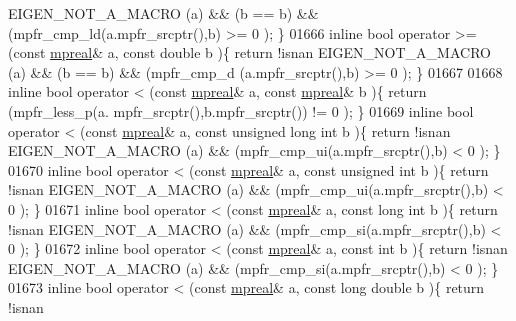 \begin{DoxyCode}
      EIGEN\_NOT\_A\_MACRO (a) && (b == b) && (mpfr\_cmp\_ld(a.mpfr\_srcptr(),b) >= 0 );   \}
01666 \textcolor{keyword}{inline} \textcolor{keywordtype}{bool} operator >= (\textcolor{keyword}{const} \hyperlink{classmpfr_1_1mpreal}{mpreal}& a, \textcolor{keyword}{const} \textcolor{keywordtype}{double} b            )\{  \textcolor{keywordflow}{return} !isnan 
      EIGEN\_NOT\_A\_MACRO (a) && (b == b) && (mpfr\_cmp\_d (a.mpfr\_srcptr(),b) >= 0 );   \}
01667 
01668 \textcolor{keyword}{inline} \textcolor{keywordtype}{bool} operator <  (\textcolor{keyword}{const} \hyperlink{classmpfr_1_1mpreal}{mpreal}& a, \textcolor{keyword}{const} \hyperlink{classmpfr_1_1mpreal}{mpreal}& b           )\{  \textcolor{keywordflow}{return} (mpfr\_less\_p(a.
      mpfr\_srcptr(),b.mpfr\_srcptr()) != 0 );               \}
01669 \textcolor{keyword}{inline} \textcolor{keywordtype}{bool} operator <  (\textcolor{keyword}{const} \hyperlink{classmpfr_1_1mpreal}{mpreal}& a, \textcolor{keyword}{const} \textcolor{keywordtype}{unsigned} \textcolor{keywordtype}{long} \textcolor{keywordtype}{int} b )\{  \textcolor{keywordflow}{return} !isnan 
      EIGEN\_NOT\_A\_MACRO (a) && (mpfr\_cmp\_ui(a.mpfr\_srcptr(),b) < 0 );                 \}
01670 \textcolor{keyword}{inline} \textcolor{keywordtype}{bool} operator <  (\textcolor{keyword}{const} \hyperlink{classmpfr_1_1mpreal}{mpreal}& a, \textcolor{keyword}{const} \textcolor{keywordtype}{unsigned} \textcolor{keywordtype}{int} b      )\{  \textcolor{keywordflow}{return} !isnan 
      EIGEN\_NOT\_A\_MACRO (a) && (mpfr\_cmp\_ui(a.mpfr\_srcptr(),b) < 0 );                 \}
01671 \textcolor{keyword}{inline} \textcolor{keywordtype}{bool} operator <  (\textcolor{keyword}{const} \hyperlink{classmpfr_1_1mpreal}{mpreal}& a, \textcolor{keyword}{const} \textcolor{keywordtype}{long} \textcolor{keywordtype}{int} b          )\{  \textcolor{keywordflow}{return} !isnan 
      EIGEN\_NOT\_A\_MACRO (a) && (mpfr\_cmp\_si(a.mpfr\_srcptr(),b) < 0 );                 \}
01672 \textcolor{keyword}{inline} \textcolor{keywordtype}{bool} operator <  (\textcolor{keyword}{const} \hyperlink{classmpfr_1_1mpreal}{mpreal}& a, \textcolor{keyword}{const} \textcolor{keywordtype}{int} b               )\{  \textcolor{keywordflow}{return} !isnan 
      EIGEN\_NOT\_A\_MACRO (a) && (mpfr\_cmp\_si(a.mpfr\_srcptr(),b) < 0 );                 \}
01673 \textcolor{keyword}{inline} \textcolor{keywordtype}{bool} operator <  (\textcolor{keyword}{const} \hyperlink{classmpfr_1_1mpreal}{mpreal}& a, \textcolor{keyword}{const} \textcolor{keywordtype}{long} \textcolor{keywordtype}{double} b       )\{  \textcolor{keywordflow}{return} !isnan 

\end{DoxyCode}
